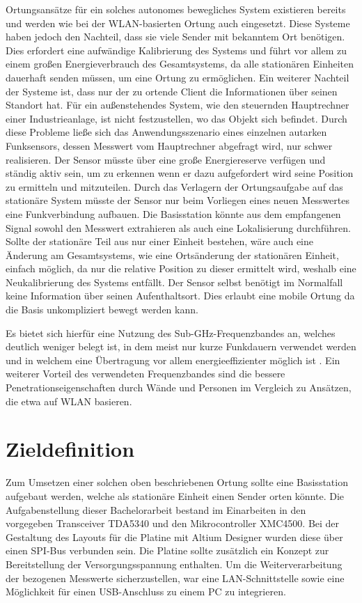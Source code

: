 Ortungsansätze für ein solches autonomes bewegliches System existieren bereits und werden wie bei der WLAN-basierten Ortung auch eingesetzt. Diese Systeme haben jedoch den Nachteil, dass sie viele Sender mit bekanntem Ort benötigen. Dies erfordert eine aufwändige Kalibrierung des Systems und führt vor allem zu einem großen Energieverbrauch des Gesamtsystems, da alle stationären Einheiten dauerhaft senden müssen, um eine Ortung zu ermöglichen.
Ein weiterer Nachteil der Systeme ist, dass nur der zu ortende Client die Informationen über seinen Standort hat. Für ein außenstehendes System, wie den steuernden Hauptrechner einer Industrieanlage, ist nicht festzustellen, wo das Objekt sich befindet. 
Durch diese Probleme ließe sich das Anwendungsszenario eines einzelnen autarken Funksensors, dessen Messwert vom Hauptrechner abgefragt wird, nur schwer realisieren. Der Sensor müsste über eine große Energiereserve verfügen und ständig aktiv sein, um zu erkennen wenn er dazu aufgefordert wird seine Position zu ermitteln und mitzuteilen.
Durch das Verlagern der Ortungsaufgabe auf das stationäre System müsste der Sensor nur beim Vorliegen eines neuen Messwertes eine Funkverbindung aufbauen. Die Basisstation könnte aus dem empfangenen Signal sowohl den Messwert extrahieren als auch eine Lokalisierung durchführen.
Sollte der stationäre Teil  aus nur einer Einheit bestehen, wäre auch eine Änderung am Gesamtsystems, wie eine Ortsänderung der stationären Einheit, einfach möglich, da nur die relative Position zu dieser ermittelt wird, weshalb eine Neukalibrierung des Systems entfällt. Der Sensor selbst benötigt im Normalfall keine Information über seinen Aufenthaltsort. Dies erlaubt eine mobile Ortung da die Basis unkompliziert bewegt werden kann.


Es bietet sich hierfür eine Nutzung des Sub-GHz-Frequenzbandes an, welches deutlich weniger belegt ist, in dem meist nur kurze Funkdauern verwendet werden und in welchem eine Übertragung vor allem energieeffizienter möglich ist \cite{SabolcikGHzoderSub}.
Ein weiterer Vorteil des verwendeten Frequenzbandes sind die bessere Penetrationseigenschaften durch Wände und Personen im Vergleich zu Ansätzen, die etwa auf WLAN basieren.


\section{Zieldefinition}
Zum Umsetzen einer solchen oben beschriebenen Ortung sollte eine Basisstation aufgebaut werden, welche als stationäre Einheit einen Sender orten könnte.
Die Aufgabenstellung dieser Bachelorarbeit bestand im Einarbeiten in den vorgegeben Transceiver TDA5340 und den Mikrocontroller XMC4500. Bei der Gestaltung des Layouts für die Platine mit Altium Designer wurden diese über einen SPI-Bus verbunden sein. Die Platine sollte zusätzlich ein Konzept zur Bereitstellung der Versorgungsspannung enthalten. Um die Weiterverarbeitung der bezogenen Messwerte sicherzustellen, war eine LAN-Schnittstelle sowie eine Möglichkeit für einen USB-Anschluss zu einem PC zu integrieren.

